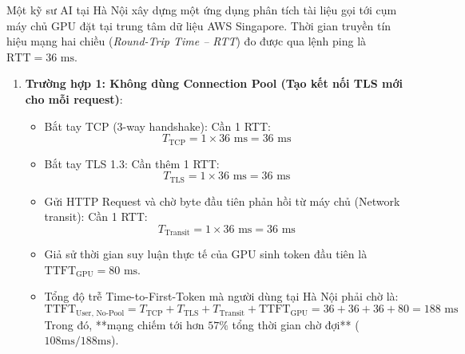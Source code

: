 \begin{example}
Một kỹ sư AI tại Hà Nội xây dựng một ứng dụng phân tích tài liệu gọi tới cụm máy chủ GPU đặt tại trung tâm dữ liệu AWS Singapore. 
Thời gian truyền tín hiệu mạng hai chiều (\textit{Round-Trip Time -- RTT}) đo được qua lệnh ping là $\text{RTT} = 36\text{ ms}$.

\begin{enumerate}
  \item \textbf{Trường hợp 1: Không dùng Connection Pool (Tạo kết nối TLS mới cho mỗi request)}:
  \begin{itemize}
    \item Bắt tay TCP (3-way handshake): Cần 1 RTT:
    \begin{equation*}
    T_{\text{TCP}} = 1 \times 36\text{ ms} = 36\text{ ms}
    \end{equation*}
    \item Bắt tay TLS 1.3: Cần thêm 1 RTT:
    \begin{equation*}
    T_{\text{TLS}} = 1 \times 36\text{ ms} = 36\text{ ms}
    \end{equation*}
    \item Gửi HTTP Request và chờ byte đầu tiên phản hồi từ máy chủ (Network transit): Cần 1 RTT:
    \begin{equation*}
    T_{\text{Transit}} = 1 \times 36\text{ ms} = 36\text{ ms}
    \end{equation*}
    \item Giả sử thời gian suy luận thực tế của GPU sinh token đầu tiên là $\text{TTFT}_{\text{GPU}} = 80\text{ ms}$.
    \item Tổng độ trễ Time-to-First-Token mà người dùng tại Hà Nội phải chờ là:
    \begin{equation*}
    \text{TTFT}_{\text{User, No-Pool}} = T_{\text{TCP}} + T_{\text{TLS}} + T_{\text{Transit}} + \text{TTFT}_{\text{GPU}} = 36 + 36 + 36 + 80 = 188\text{ ms}
    \end{equation*}
    Trong đó, **mạng chiếm tới hơn $57\%$ tổng thời gian chờ đợi** ($108\text{ms} / 188\text{ms}$).
  \end{itemize}


\end{enumerate}
\end{example}
